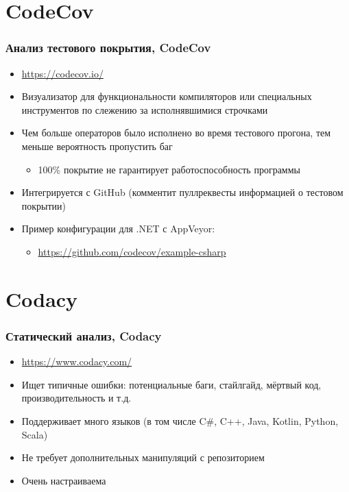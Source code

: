 \documentclass{../../slides-style}
\begin{document}
    \section{CodeCov}

    \begin{frame}
        \frametitle{Анализ тестового покрытия, CodeCov}
        \begin{itemize}
            \item \url{https://codecov.io/}
            \item Визуализатор для функциональности компиляторов или специальных инструментов по слежению за исполнявшимися строчками
            \item Чем больше операторов было исполнено во время тестового прогона, тем меньше вероятность пропустить баг
            \begin{itemize}
                \item 100\% покрытие не гарантирует работоспособность программы
            \end{itemize}
            \item Интегрируется с GitHub (комментит пуллреквесты информацией о тестовом покрытии)
            \item Пример конфигурации для .NET с AppVeyor:
            \begin{itemize}
                \item \url{https://github.com/codecov/example-csharp}
            \end{itemize}
        \end{itemize}
    \end{frame}

    \section{Codacy}

    \begin{frame}
        \frametitle{Статический анализ, Codacy}
        \begin{itemize}
            \item \url{https://www.codacy.com/}
            \item Ищет типичные ошибки: потенциальные баги, стайлгайд, мёртвый код, производительность и т.д.
            \item Поддерживает много языков (в том числе C\#, C++, Java, Kotlin, Python, Scala)
            \item Не требует дополнительных манипуляций с репозиторием
            \item Очень настраиваема
        \end{itemize}
    \end{frame}
\end{document}
